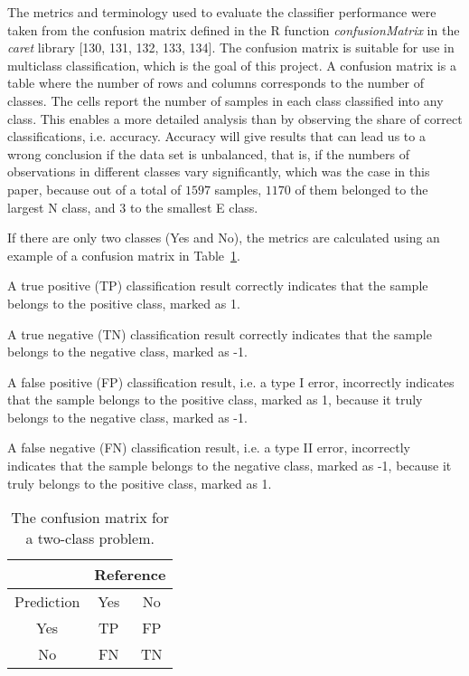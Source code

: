 \documentclass[preprint,12pt]{elsarticle}
\begin{document}
The metrics and terminology used to evaluate the classifier performance were taken from the confusion matrix defined in the R function \textit{confusionMatrix} in the \textit{caret} library [130, 131, 132, 133, 134]. The confusion matrix is suitable for use in multiclass classification, which is the goal of this project. A confusion matrix is a table where the number of rows and columns corresponds to the number of classes. The cells report the number of samples in each class classified into any class. This enables a more detailed analysis than by observing the share of correct classifications, i.e. accuracy. Accuracy will give results that can lead us to a wrong conclusion if the data set is unbalanced, that is, if the numbers of observations in different classes vary significantly, which was the case in this paper, because out of a total of $1597$ samples, $1170$ of them belonged to the largest N class, and $3$ to the smallest E class.

If there are only two classes (Yes and No), the metrics are calculated using an example of a confusion matrix in Table~\ref{tab:cm}.

A true positive (TP) classification result correctly indicates that the sample belongs to the positive class, marked as 1.

A true negative (TN) classification result correctly indicates that the sample belongs to the negative class, marked as -1.
 
A false positive (FP) classification result, i.e. a type I error, incorrectly indicates that the sample belongs to the positive class, marked as 1, because it truly belongs to the negative class, marked as -1.

A false negative (FN) classification result, i.e. a type II error, incorrectly indicates that the sample belongs to the negative class, marked as -1, because it truly belongs to the positive class, marked as 1.

\begin{table}[!ht]
	\centering
	\begin{tabular}{|c|c|c|}
		\hline
		 & \multicolumn{2}{|c|}{Reference} \\ \hline
        Prediction & Yes & No \\ \hline
        Yes & TP & FP \\ \hline
        No & FN & TN \\ \hline
	\end{tabular}
	\caption{The confusion matrix for a two-class problem.}
	\label{tab:cm}
\end{table}
\end{document}

